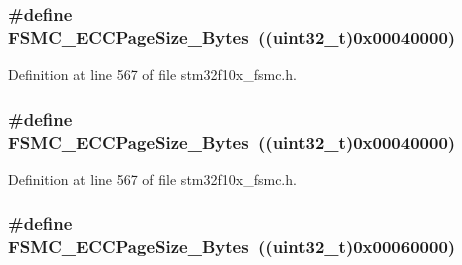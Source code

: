\subsubsection[{\texorpdfstring{F\+S\+M\+C\+\_\+\+E\+C\+C\+Page\+Size\+\_\+1024\+Bytes}{FSMC_ECCPageSize_1024Bytes}}]{\setlength{\rightskip}{0pt plus 5cm}\#define F\+S\+M\+C\+\_\+\+E\+C\+C\+Page\+Size\+\_\+Bytes~(({\bf uint32\+\_\+t})0x00040000)}\hypertarget{group___f_s_m_c___e_c_c___page___size_ga8137931c96b63ec7e6f80a8c7391433f}{}\label{group___f_s_m_c___e_c_c___page___size_ga8137931c96b63ec7e6f80a8c7391433f}


Definition at line 567 of file stm32f10x\+\_\+fsmc.\+h.

\subsubsection[{\texorpdfstring{F\+S\+M\+C\+\_\+\+E\+C\+C\+Page\+Size\+\_\+1024\+Bytes}{FSMC_ECCPageSize_1024Bytes}}]{\setlength{\rightskip}{0pt plus 5cm}\#define F\+S\+M\+C\+\_\+\+E\+C\+C\+Page\+Size\+\_\+Bytes~(({\bf uint32\+\_\+t})0x00040000)}\hypertarget{group___f_s_m_c___e_c_c___page___size_ga8137931c96b63ec7e6f80a8c7391433f}{}\label{group___f_s_m_c___e_c_c___page___size_ga8137931c96b63ec7e6f80a8c7391433f}


Definition at line 567 of file stm32f10x\+\_\+fsmc.\+h.

\subsubsection[{\texorpdfstring{F\+S\+M\+C\+\_\+\+E\+C\+C\+Page\+Size\+\_\+2048\+Bytes}{FSMC_ECCPageSize_2048Bytes}}]{\setlength{\rightskip}{0pt plus 5cm}\#define F\+S\+M\+C\+\_\+\+E\+C\+C\+Page\+Size\+\_\+Bytes~(({\bf uint32\+\_\+t})0x00060000)}\hypertarget{group___f_s_m_c___e_c_c___page___size_gab8f3ae95becd59e71a976b97ded904b8}{}\label{group___f_s_m_c___e_c_c___page___size_gab8f3ae95becd59e71a976b97ded904b8}


